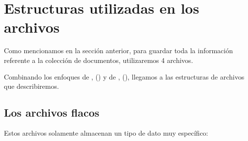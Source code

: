 \section{Estructuras utilizadas en los archivos}

Como mencionamos en la sección anterior, para guardar toda la información referente a la colección de documentos, utilizaremos 4 archivos.

Combinando los enfoques de \citet{Zhang:2008}, (\citeyear{Zhang:2008}) y de \citet[p.~107]{Buettcher2010}, (\citeyear{Buettcher2010}), llegamos a las estructuras de archivos que describiremos.


\subsection{Los archivos flacos}

Estos archivos solamente almacenan un tipo de dato muy específico:

